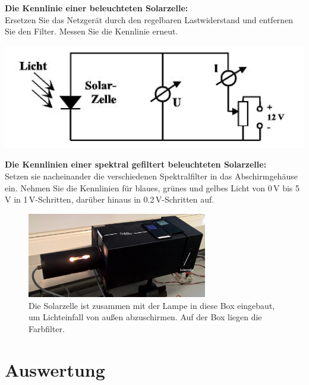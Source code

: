 \begin{enumerate}
	\begin{minipage}{0.6\textwidth}
			\item \textbf{Die Kennlinie einer beleuchteten Solarzelle:}\\
		Ersetzen Sie das Netzgerät durch den regelbaren Lastwiderstand und entfernen Sie den Filter. Messen Sie die Kennlinie erneut.
	\end{minipage}
	\begin{minipage}{0.4\textwidth}
				\includegraphics[width=1.00\textwidth]{Abbildungen/solarzelle.jpg}
				\label{fig:solarzelle }
		\end{minipage}
	\item \textbf{Die Kennlinien einer spektral gefiltert beleuchteten Solarzelle:}\\
		Setzen sie nacheinander die verschiedenen Spektralfilter in das Abschirmgehäuse ein. Nehmen Sie die Kennlinien für blaues, grünes und gelbes Licht von 0\,V bis 5\,V in 1\,V-Schritten, darüber hinaus in 0.2\,V-Schritten auf.
\end{enumerate}

\begin{figure}[h]
	\centering
	\includegraphics[width=0.7\textwidth]{Abbildungen/Solarzelle_gross.jpg}
	\caption{Die Solarzelle ist zusammen mit der Lampe in diese Box eingebaut, um Lichteinfall von außen abzuschirmen. Auf der Box liegen die Farbfilter.}
\end{figure}

\section{Auswertung} 

